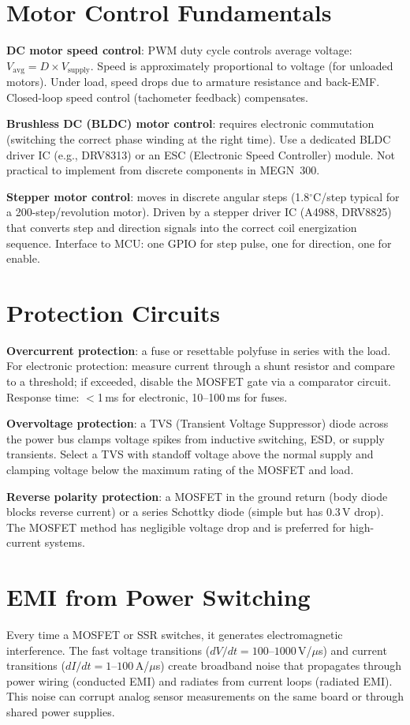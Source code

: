 \documentclass[11pt,letterpaper,twoside,openany]{book}
\newcommand{\degC}{\ensuremath{{}^{\circ}\text{C}}}
\begin{document}
\section{Motor Control Fundamentals}
\textbf{DC motor speed control}: PWM duty cycle controls average voltage: $V_{\text{avg}} = D \times V_{\text{supply}}$. Speed is approximately proportional to voltage (for unloaded motors). Under load, speed drops due to armature resistance and back-EMF. Closed-loop speed control (tachometer feedback) compensates.

\textbf{Brushless DC (BLDC) motor control}: requires electronic commutation (switching the correct phase winding at the right time). Use a dedicated BLDC driver IC (e.g., DRV8313) or an ESC (Electronic Speed Controller) module. Not practical to implement from discrete components in MEGN~300.

\textbf{Stepper motor control}: moves in discrete angular steps (1.8\degC{}/step typical for a 200-step/revolution motor). Driven by a stepper driver IC (A4988, DRV8825) that converts step and direction signals into the correct coil energization sequence. Interface to MCU: one GPIO for step pulse, one for direction, one for enable.

\section{Protection Circuits}
\textbf{Overcurrent protection}: a fuse or resettable polyfuse in series with the load. For electronic protection: measure current through a shunt resistor and compare to a threshold; if exceeded, disable the MOSFET gate via a comparator circuit. Response time: $<$1\,ms for electronic, 10--100\,ms for fuses.

\textbf{Overvoltage protection}: a TVS (Transient Voltage Suppressor) diode across the power bus clamps voltage spikes from inductive switching, ESD, or supply transients. Select a TVS with standoff voltage above the normal supply and clamping voltage below the maximum rating of the MOSFET and load.

\textbf{Reverse polarity protection}: a MOSFET in the ground return (body diode blocks reverse current) or a series Schottky diode (simple but has 0.3\,V drop). The MOSFET method has negligible voltage drop and is preferred for high-current systems.
\section{EMI from Power Switching}
Every time a MOSFET or SSR switches, it generates electromagnetic interference. The fast voltage transitions ($dV/dt = 100$--$1000$\,V/$\mu$s) and current transitions ($dI/dt = 1$--$100$\,A/$\mu$s) create broadband noise that propagates through power wiring (conducted EMI) and radiates from current loops (radiated EMI). This noise can corrupt analog sensor measurements on the same board or through shared power supplies.
\end{document}
